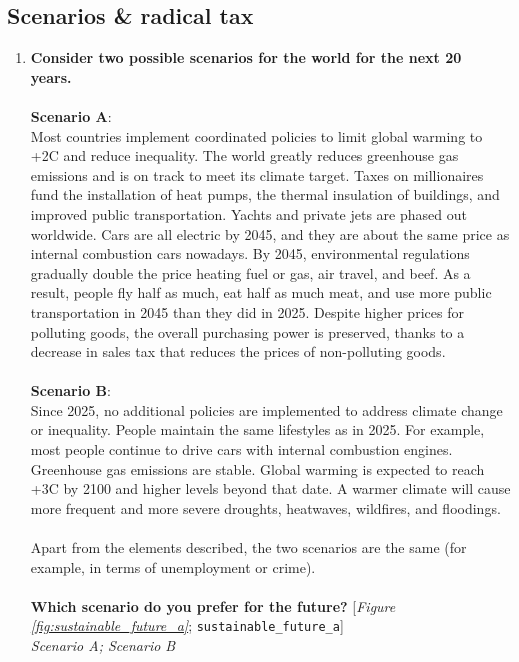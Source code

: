  \subsection*{Scenarios \& radical tax} 
 \begin{enumerate}[resume] 
\item  \label{q:sustainable_future_a} \textbf{Consider two possible scenarios for the world for the next 20 years.~\\\\Scenario A}: \\Most countries implement coordinated policies to limit global warming to +2\textdegree{}C and reduce inequality. The world greatly reduces greenhouse gas emissions and is on track to meet its climate target. Taxes on millionaires fund the installation of heat pumps, the thermal insulation of buildings, and improved public transportation. Yachts and private jets are phased out worldwide. Cars are all electric by 2045, and they are about the same price as internal combustion cars nowadays. By 2045, environmental regulations gradually double the price heating fuel or gas, air travel, and beef. As a result, people fly half as much, eat half as much meat, and use more public transportation in 2045 than they did in 2025. Despite higher prices for polluting goods, the overall purchasing power is preserved, thanks to a decrease in sales tax that reduces the prices of non-polluting goods.\\\\\textbf{Scenario B}:\\Since 2025, no additional policies are implemented to address climate change or inequality. People maintain the same lifestyles as in 2025. For example, most people continue to drive cars with internal combustion engines. Greenhouse gas emissions are stable. Global warming is expected to reach +3\textdegree{}C by 2100 and higher levels beyond that date. A warmer climate will cause more frequent and more severe droughts, heatwaves, wildfires, and floodings.\\\\Apart from the elements described, the two scenarios are the same (for example, in terms of unemployment or crime). \\\\\textbf{Which scenario do you prefer for the future?} [\textit{Figure \ref{fig:sustainable_future_a}}; 
\verb|sustainable_future_a|]
  \\ \textit{Scenario A; Scenario B}


\end{enumerate}
